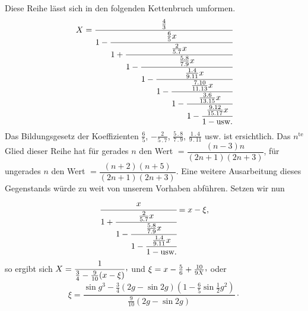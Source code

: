 Diese Reihe lässt sich in den folgenden Kettenbruch umformen.
\[
X=\cfrac{\tfrac43}{1-\cfrac{\tfrac65x}{1+\cfrac{\tfrac{2}{5\mathbin{.}7}x}{1-\cfrac{\tfrac{5\mathbin{.}8}{7\mathbin{.}9}x}{1-\cfrac{\tfrac{1\mathbin{.}4}{9\mathbin{.}11}x}{1-\cfrac{\tfrac{7\mathbin{.}10}{11\mathbin{.}13}x}{1-\cfrac{\tfrac{3\mathbin{.}6}{13\mathbin{.}15}x}{1-\cfrac{\tfrac{9\mathbin{.}12}{15\mathbin{.}17}x}{1-\text{usw.}}}}}}}}}
\]
Das Bildungsgesetz der Koeffizienten $\tfrac65$, $-\tfrac{2}{5\mathbin{.}7}$, $\tfrac{5\mathbin{.}8}{7\mathbin{.}9}$, $\tfrac{1\mathbin{.}4}{9\mathbin{.}11}$ usw. ist ersichtlich. Das $n^{\mathrm{te}}$ Glied dieser Reihe hat für gerades $n$ den Wert $=\dfrac{(n-3)n}{(2n+1)(2n+3)}$, für ungerades $n$ den Wert $=\dfrac{(n+2)(n+5)}{(2n+1)(2n+3)}$. Eine weitere Ausarbeitung dieses Gegenstands\HistoricalNoteEight{Siehe Band III, S. 135.]} würde zu weit von unserem Vorhaben abführen. Setzen wir nun
\[
\cfrac{x}{1+\cfrac{\tfrac{2}{5\mathbin{.}7}x}{1-\cfrac{\tfrac{5\mathbin{.}8}{7\mathbin{.}9}x}{1-\cfrac{\tfrac{1\mathbin{.}4}{9\mathbin{.}11}x}{1-\text{usw.}}}}}=x-\xi,
\]
so ergibt sich $X=\dfrac{1}{\frac34-\frac{9}{10}(x-\xi)}\mathpunct{\raisebox{.45ex}{,}}$ und $\xi=x-\frac56+\frac{10}{9X}\mathpunct{\raisebox{.45ex}{,}}$ oder
\[
\xi=\dfrac{\sin g^3-\frac34(2g-\sin 2g)(1-\frac65\sin\frac12 g^2)}{\frac{9}{10}(2g-\sin 2g)}\mathpunct{\cdot}
\]

